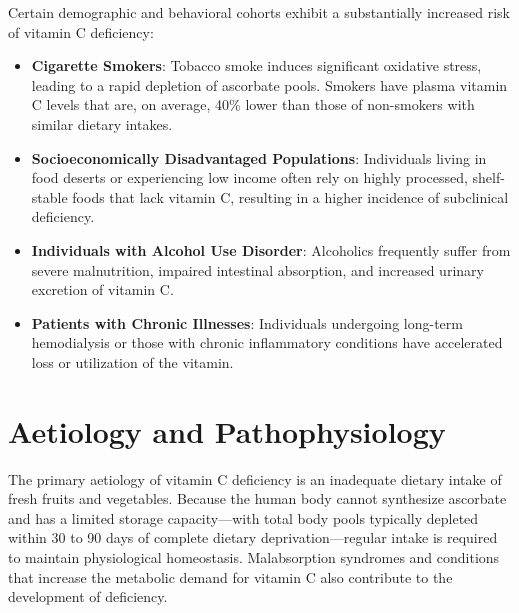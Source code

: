 Certain demographic and behavioral cohorts exhibit a substantially increased risk of vitamin C deficiency:
\begin{itemize}
    \item \textbf{Cigarette Smokers}: Tobacco smoke induces significant oxidative stress, leading to a rapid depletion of ascorbate pools. Smokers have plasma vitamin C levels that are, on average, 40\% lower than those of non-smokers with similar dietary intakes.
    \item \textbf{Socioeconomically Disadvantaged Populations}: Individuals living in food deserts or experiencing low income often rely on highly processed, shelf-stable foods that lack vitamin C, resulting in a higher incidence of subclinical deficiency.
    \item \textbf{Individuals with Alcohol Use Disorder}: Alcoholics frequently suffer from severe malnutrition, impaired intestinal absorption, and increased urinary excretion of vitamin C.
    \item \textbf{Patients with Chronic Illnesses}: Individuals undergoing long-term hemodialysis or those with chronic inflammatory conditions have accelerated loss or utilization of the vitamin.
\end{itemize}

\section*{Aetiology and Pathophysiology}
The primary aetiology of vitamin C deficiency is an inadequate dietary intake of fresh fruits and vegetables. Because the human body cannot synthesize ascorbate and has a limited storage capacity—with total body pools typically depleted within 30 to 90 days of complete dietary deprivation—regular intake is required to maintain physiological homeostasis. Malabsorption syndromes and conditions that increase the metabolic demand for vitamin C also contribute to the development of deficiency.


